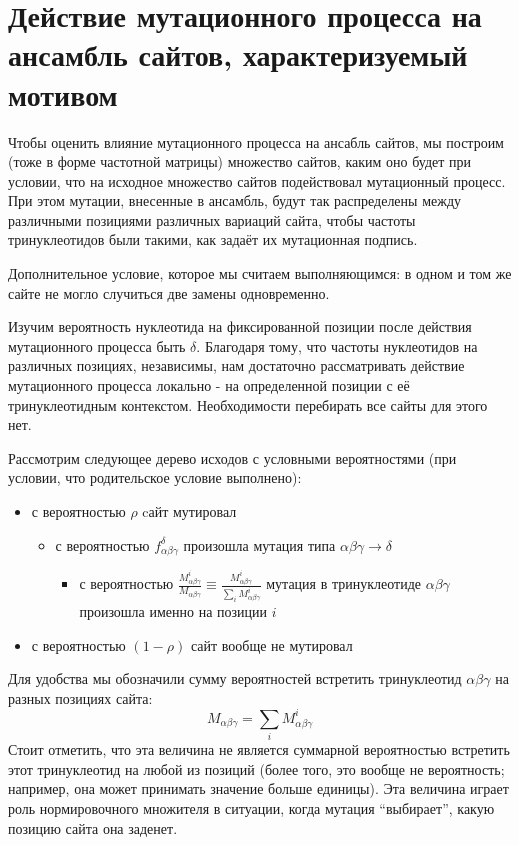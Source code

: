 \documentclass[a4paper]{article}
\begin{document}

\section{Действие мутационного процесса на ансамбль сайтов, характеризуемый мотивом}
Чтобы оценить влияние мутационного процесса на ансабль сайтов, мы построим (тоже в форме частотной матрицы) множество сайтов, каким оно будет при условии, что на исходное множество сайтов подействовал мутационный процесс. При этом мутации, внесенные в ансамбль, будут так распределены между различными позициями различных вариаций сайта, чтобы частоты тринуклеотидов были такими, как задаёт их мутационная подпись. 

Дополнительное условие, которое мы считаем выполняющимся: в одном и том же сайте не могло случиться две замены одновременно.

Изучим вероятность нуклеотида на фиксированной позиции после действия мутационного процесса быть $\delta$. Благодаря тому, что частоты нуклеотидов на различных позициях, независимы, нам достаточно рассматривать действие мутационного процесса локально - на определенной позиции с её тринуклеотидным контекстом. Необходимости перебирать все сайты для этого нет.

Рассмотрим следующее дерево исходов с условными вероятностями (при условии, что родительское условие выполнено):
\begin{itemize}
	\item с вероятностью $\rho$ cайт мутировал
	\begin{itemize}
		\item с вероятностью $f_{\alpha\beta\gamma}^{\delta}$ произошла мутация типа $\alpha\beta\gamma\to\delta$
		\begin{itemize}
			\item с вероятностью $\frac{M^i_{\alpha\beta\gamma}}{M_{\alpha\beta\gamma}} \equiv \frac{M^i_{\alpha\beta\gamma}}{\sum_i M^i_{\alpha\beta\gamma}}$ мутация в тринуклеотиде $\alpha\beta\gamma$ произошла именно на позиции $i$
		\end{itemize}
	\end{itemize}
	\item с вероятностью $(1-\rho)$ сайт вообще не мутировал
\end{itemize}

Для удобства мы обозначили сумму вероятностей встретить тринуклеотид $\alpha\beta\gamma$ на разных позициях сайта:
\begin{equation*}
M_{\alpha\beta\gamma} = \sum_i M^i_{\alpha\beta\gamma}
\end{equation*}
Стоит отметить, что эта величина не является суммарной вероятностью встретить этот тринуклеотид на любой из позиций (более того, это вообще не вероятность; например, она может принимать значение больше единицы). Эта величина играет роль нормировочного множителя в ситуации, когда мутация ``выбирает'', какую позицию сайта она заденет.
\end{document}
